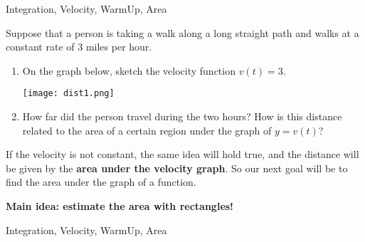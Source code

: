 
\begin{tagblock}{Integration, Velocity, WarmUp, Area}
\begin{question}

Suppose that a person is taking a walk along a long straight path and walks at a constant rate of $3$ miles per hour. 
\begin{enumerate}
\item  On the graph below, sketch the velocity function $v(t)=3$.

\hspace{1.25in}\texttt{[image: dist1.png]}

\item How far did the person travel during the two hours? How is this distance related to the area of a certain region under the graph of $y=v(t)$?
\end{enumerate}


\vfill
If the velocity is not constant, the same idea will hold true, and the distance will be given by the \textbf{area under the velocity graph}.  So our next goal will be to find the area under the graph of a function.  

\textbf{Main idea: estimate the area with rectangles!}


	
	
\begin{tags}
	    Integration, Velocity, WarmUp, Area
\end{tags}
	
\begin{diary}
\end{diary}
	
\begin{solution}
	   
	    \end{enumerate}
\end{solution}
	
\end{question}

\end{tagblock}


